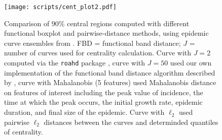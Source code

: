 \documentclass[fleqn,10pt,lineno]{wlpeerj}
\begin{document}
\begin{figure}[ht]\centering
  \texttt{[image: scripts/cent\_plot2.pdf]}
  \caption{Comparison of 90\% central regions computed with
    different functional boxplot and pairwise-distance methods, using epidemic curve ensembles from \juul. FBD = functional band distance; $J$ = number of curves used for centrality calculation. Curve with $J=2$ computed via the \texttt{roahd} package \citep{roahd}, curve with $J=50$ used our own implementation of the functional band distance algorithm described by \juul, curve with Mahalanobis (5 features) used Mahalanobis distance on features of interest including the peak value of incidence, the time at which the peak occurs, the initial growth rate, epidemic duration, and final size of the epidemic. Curve with $\ell_2$ used  pairwise $\ell_2$ distances between the curves and determinded quantiles of centrality.
  }
  \label{p.b}
\end{figure}
\end{document}
